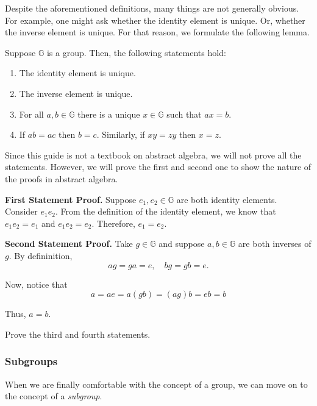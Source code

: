 \documentclass[../lecture-notes.tex]{subfiles}
\begin{document}
Despite the aforementioned definitions, many things are not generally obvious. For example, one might ask whether the identity element is unique. Or, 
whether the inverse element is unique. For that reason, we formulate the following lemma.

\begin{lemma}
    Suppose $\mathbb{G}$ is a group. Then, the following statements hold:
    \begin{enumerate}
        \item The identity element is unique.
        \item The inverse element is unique.
        \item For all $a,b \in \mathbb{G}$ there is a unique $x \in \mathbb{G}$ such that $ax = b$.
        \item If $ab=ac$ then $b=c$. Similarly, if $xy=zy$ then $x=z$.
    \end{enumerate}
\end{lemma}

Since this guide is not a textbook on abstract algebra, we will not prove all the statements. However, we will prove the first and second one to show the nature of the proofs in abstract algebra.

\textbf{First Statement Proof.} Suppose $e_1,e_2 \in \mathbb{G}$ are both identity elements. Consider $e_1e_2$. From the definition of the identity element, we know that $e_1e_2 = e_1$ and $e_1e_2 = e_2$. Therefore, $e_1 = e_2$.

\textbf{Second Statement Proof.} Take $g \in \mathbb{G}$ and suppose $a,b \in \mathbb{G}$ are both inverses of $g$. By defininition,
\begin{equation}
    ag = ga = e, \quad bg = gb = e.
\end{equation}

Now, notice that
\begin{equation}
    a = ae = a (gb) = (a g) b = e b = b
\end{equation}

Thus, $a = b$.

\begin{exercise}
    Prove the third and fourth statements.
\end{exercise}

\subsubsection{Subgroups}

When we are finally comfortable with the concept of a group, we can move on to the concept of a \textit{subgroup}. 
\end{document}
